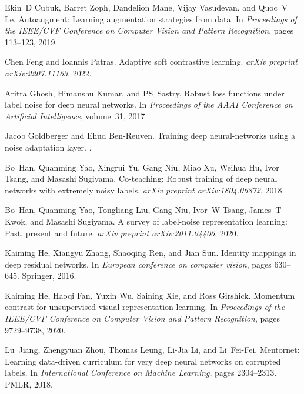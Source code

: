 \documentclass{bmvc2k}
\begin{document}
\begin{thebibliography}{46}
Ekin~D Cubuk, Barret Zoph, Dandelion Mane, Vijay Vasudevan, and Quoc~V Le.
\newblock Autoaugment: Learning augmentation strategies from data.
\newblock In \emph{Proceedings of the IEEE/CVF Conference on Computer Vision
  and Pattern Recognition}, pages 113--123, 2019.

Chen Feng and Ioannis Patras.
\newblock Adaptive soft contrastive learning.
\newblock \emph{arXiv preprint arXiv:2207.11163}, 2022.

Aritra Ghosh, Himanshu Kumar, and PS~Sastry.
\newblock Robust loss functions under label noise for deep neural networks.
\newblock In \emph{Proceedings of the AAAI Conference on Artificial
  Intelligence}, volume~31, 2017.

Jacob Goldberger and Ehud Ben-Reuven.
\newblock Training deep neural-networks using a noise adaptation layer.
.

Bo~Han, Quanming Yao, Xingrui Yu, Gang Niu, Miao Xu, Weihua Hu, Ivor Tsang, and
  Masashi Sugiyama.
\newblock Co-teaching: Robust training of deep neural networks with extremely
  noisy labels.
\newblock \emph{arXiv preprint arXiv:1804.06872}, 2018.

Bo~Han, Quanming Yao, Tongliang Liu, Gang Niu, Ivor~W Tsang, James~T Kwok, and
  Masashi Sugiyama.
\newblock A survey of label-noise representation learning: Past, present and
  future.
\newblock \emph{arXiv preprint arXiv:2011.04406}, 2020.

Kaiming He, Xiangyu Zhang, Shaoqing Ren, and Jian Sun.
\newblock Identity mappings in deep residual networks.
\newblock In \emph{European conference on computer vision}, pages 630--645.
  Springer, 2016.

Kaiming He, Haoqi Fan, Yuxin Wu, Saining Xie, and Ross Girshick.
\newblock Momentum contrast for unsupervised visual representation learning.
\newblock In \emph{Proceedings of the IEEE/CVF Conference on Computer Vision
  and Pattern Recognition}, pages 9729--9738, 2020.

Lu~Jiang, Zhengyuan Zhou, Thomas Leung, Li-Jia Li, and Li~Fei-Fei.
\newblock Mentornet: Learning data-driven curriculum for very deep neural
  networks on corrupted labels.
\newblock In \emph{International Conference on Machine Learning}, pages
  2304--2313. PMLR, 2018.


\end{thebibliography}
\end{document}
